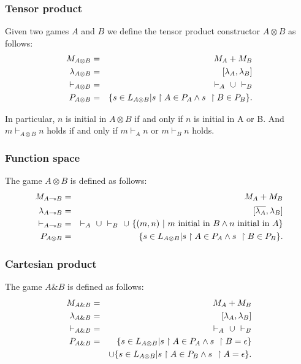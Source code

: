 \subsubsection{Tensor product}
Given two games $A$ and $B$ we define the tensor product constructor
$A \otimes B$ as follows:
\begin{eqnarray*}
  M_{A \otimes B} &=& M_A + M_B \\
  \lambda_{A\otimes B} &=& [\lambda_A,\lambda_B] \\
  \vdash_{A\otimes B} & = & \vdash_{A}\ \cup\ \vdash_{B} \\
  P_{A\otimes B} & = & \{ s \in L_{A\otimes B} | s \upharpoonright A \in P_A \wedge s \ \upharpoonright B \in P_B  \}.
\end{eqnarray*}

In particular,  $n$ is initial in $A\otimes B$ if and only if $n$ is
initial in A or B. And $m \vdash_{A\otimes B} n$  holds if and only if $m
\vdash_{A} n$ or $m \vdash_{B} n$ holds.

\subsubsection{Function space}
The game $A \otimes B$ is defined as follows:
\begin{eqnarray*}
  M_{A \multimap B} &=& M_A + M_B \\
  \lambda_{A\multimap B} &=& [\overline{\lambda_A},\lambda_B] \\
  \vdash_{A\multimap B} & = & \vdash_{A}\ \union\ \vdash_{B}\ \union\  \{ (m,n) \ |\ m \mbox{ initial in } B \wedge n \mbox{ initial in } A \} \\
  P_{A\otimes B} & = & \{ s \in L_{A\otimes B} | s \upharpoonright A \in P_A \wedge s \ \upharpoonright B \in P_B  \}.
\end{eqnarray*}

\subsubsection{Cartesian product}
The game $A \& B$ is defined as follows:
\begin{eqnarray*}
  M_{A \& B} &=& M_A + M_B \\
  \lambda_{A\& B} &=& [\lambda_A,\lambda_B] \\
  \vdash_{A\& B} & = & \vdash_{A}\ \cup\ \vdash_{B} \\
  P_{A\& B} & = & \{ s \in L_{A\otimes B} | s \upharpoonright A \in P_A \wedge s \ \upharpoonright B = \epsilon  \} \\
        &&   \cup \{ s \in L_{A\otimes B} | s \upharpoonright A \in P_B \wedge s \ \upharpoonright A = \epsilon  \}.
\end{eqnarray*}

